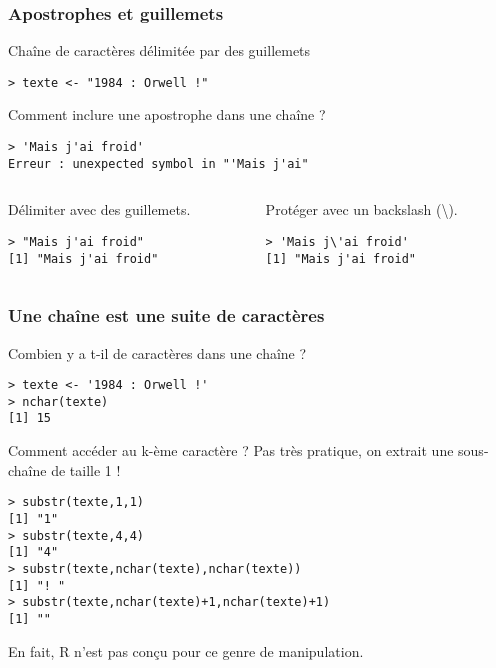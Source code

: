 \documentclass[10pt]{beamer}
\begin{document}
\begin{frame}[fragile]
  \frametitle{Apostrophes et guillemets}
\begin{block}{Chaîne de caractères délimitée par des guillemets}
  \begin{lstlisting}[style=edblock]
> texte <- "1984 : Orwell !"
  \end{lstlisting}
\end{block}

\begin{exampleblock}{Comment inclure une apostrophe dans une chaîne ?}
  \begin{lstlisting}[style=block]
> 'Mais j'ai froid'
Erreur : unexpected symbol in "'Mais j'ai"    
\end{lstlisting}
\begin{columns}[t]
  \begin{column}{0.48\textwidth}
    Délimiter avec des guillemets.
  \begin{lstlisting}
> "Mais j'ai froid"
[1] "Mais j'ai froid"    
\end{lstlisting}
\end{column}
\begin{column}{0.48\textwidth}
  Protéger avec un backslash (\textbackslash).
  \begin{lstlisting}
> 'Mais j\'ai froid'
[1] "Mais j'ai froid"
\end{lstlisting}
\end{column}
\end{columns}

\end{exampleblock}
\end{frame}


\begin{frame}[fragile]
  \frametitle{Une chaîne est une suite de caractères}
  \begin{block}{Combien y a t-il de caractères dans une chaîne ?}
    \begin{lstlisting}[style=block]
> texte <- '1984 : Orwell !'
> nchar(texte)
[1] 15      
    \end{lstlisting}
  \end{block}

  \begin{block}{Comment accéder au k-ème caractère ?}
    Pas très pratique, on extrait une sous-chaîne de taille 1 !
    \begin{lstlisting}[style=block]
> substr(texte,1,1)
[1] "1"
> substr(texte,4,4)
[1] "4"
> substr(texte,nchar(texte),nchar(texte))
[1] "! "
> substr(texte,nchar(texte)+1,nchar(texte)+1)
[1] ""
    \end{lstlisting}
    En fait, R n’est pas conçu pour ce genre de manipulation.    
  \end{block}
\end{frame}
\end{document}
